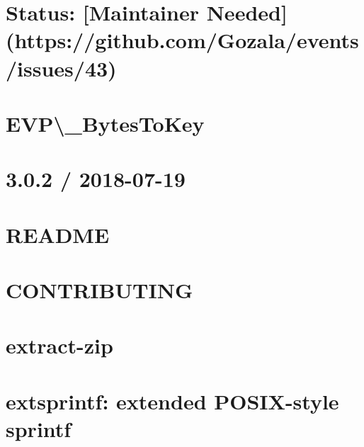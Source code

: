 \documentclass[twoside]{book}
\newcommand{\+}{\discretionary{\mbox{\scriptsize$\hookleftarrow$}}{}{}}
\begin{document}
\chapter{Status\+: \mbox{[}Maintainer Needed\mbox{]}(https\+://github.com/\+Gozala/events/issues/43)}
\label{md_dsmacc_examples_DRmerge_node_modules_events_Readme}

\chapter{E\+VP\textbackslash{}\+\_\+\+Bytes\+To\+Key}
\label{md_dsmacc_examples_DRmerge_node_modules_evp_bytestokey_README}

\chapter{3.0.2 / 2018-\/07-\/19}
\label{md_dsmacc_examples_DRmerge_node_modules_extend_CHANGELOG}

\chapter{R\+E\+A\+D\+ME}
\label{md_dsmacc_examples_DRmerge_node_modules_extend_README}

\chapter{C\+O\+N\+T\+R\+I\+B\+U\+T\+I\+NG}
\label{md_dsmacc_examples_DRmerge_node_modules_extract-zip_CONTRIBUTING}

\chapter{extract-\/zip}
\label{md_dsmacc_examples_DRmerge_node_modules_extract-zip_readme}

\chapter{extsprintf\+: extended P\+O\+S\+I\+X-\/style sprintf}
\label{md_dsmacc_examples_DRmerge_node_modules_extsprintf_README}

\end{document}
